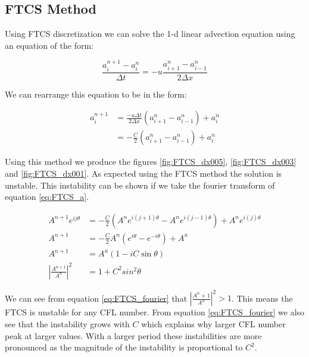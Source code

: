\subsection*{FTCS Method}
\label{sec:Q5b}

Using FTCS discretization we can solve the 1-d linear advection equation using an equation of the form:

\begin{equation}
    \frac{a_i^{n+1} - a_i^n}{\Delta t} = -u \frac{a_{i+1}^{n} - a_{i-1}^n}{2 \Delta x}
\label{eq:FTCS}
\end{equation}

We can rearrange this equation to be in the form:

\begin{equation}
\begin{split}
    a_i^{n+1} & = \frac{-u \Delta t}{2 \Delta x} (a_{i+1}^{n} - a_{i-1}^n) + a_i^n \\
              & = - \frac{C}{2} (a_{i+1}^{n} - a_{i-1}^n) + a_i^n
\end{split}
\label{eq:FTCS_a}
\end{equation}

Using this method we produce the figures \ref{fig:FTCS_dx005}, \ref{fig:FTCS_dx003} and \ref{fig:FTCS_dx001}. As expected using the FTCS method the solution is unstable. This instability can be shown if we take the fourier transform of equation \ref{eq:FTCS_a}. 

\begin{equation}
\begin{split}
    A^{n+1}e^{ij\theta} &= - \frac{C}{2} (A^{n}e^{i(j+1)\theta} - A^{n}e^{i(j-1)\theta}) + A^{n}e^{i(j)\theta} \\
    A^{n+1} &= -\frac{C}{2} A^n(e^{i\theta} - e^{-i\theta}) + A^n \\
    A^{n+1} &= A^n(1 - iC \sin\theta) \\
    \left|\frac{A^{n+1}}{A^n}\right|^2 &= 1 + C^2 sin^2\theta
\end{split}
\label{eq:FTCS_fourier}
\end{equation}

We can see from equation \ref{eq:FTCS_fourier} that $\left|\frac{A^n+1}{A^n}\right|^2 > 1$. This means the FTCS is unstable for any CFL number. From equation \ref{eq:FTCS_fourier} we also see that the instability grows with $C$ which explains why larger CFL number peak at larger values. With a larger period these instabilities are more pronounced as the magnitude of the instability is proportional to $C^2$.